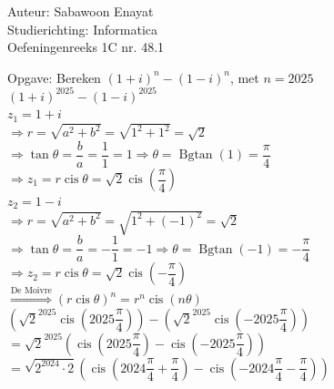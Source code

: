 \documentclass[a4paper]{article}
\begin{document}
  
\noindent \large Auteur: Sabawoon Enayat \\
\noindent \large Studierichting: Informatica\\
\noindent \large Oefeningenreeks 1C nr. 48.1\\

\newcommand{\Bgtan}{\operatorname{Bgtan}}
\newcommand{\cis}{\operatorname{cis}}

\medskip

\normalsize

Opgave: Bereken $(1 + i)^n - (1 - i)^n$, met $n = 2025$\\

$(1 + i)^{2025} - (1 - i)^{2025}$\\

$z_1 = 1 + i$\\

$\Rightarrow r = \sqrt{a^2 + b^2} = \sqrt{1^2 + 1^2} = \sqrt{2}$\\

$\Rightarrow \tan \theta = \dfrac{b}{a} = \dfrac{1}{1} = 1 \Rightarrow \theta = \Bgtan (1) = \dfrac{\pi}{4}$\\

$\Rightarrow z_1 = r \cis \theta = \sqrt{2} \cis \left(\dfrac{\pi}{4}\right)$\\

$z_2 = 1 - i$\\

$\Rightarrow r = \sqrt{a^2 + b^2} = \sqrt{1^2 + (-1)^2} = \sqrt{2}$\\

$\Rightarrow \tan \theta = \dfrac{b}{a} = -\dfrac{1}{1} = -1 \Rightarrow \theta = \Bgtan (-1) = -\dfrac{\pi}{4}$\\

$\Rightarrow z_2 = r \cis \theta = \sqrt{2} \cis \left(-\dfrac{\pi}{4}\right)$\\

$\overset{\text{De Moivre}}{\Rightarrow} (r \cis \theta)^n = r^n \cis (n\theta)$\\

$\left(\sqrt{2}^{2025} \cis \left(2025 \dfrac{\pi}{4}\right)\right) - \left(\sqrt{2}^{2025} \cis \left(-2025 \dfrac{\pi}{4}\right)\right)$\\

$= \sqrt{2}^{2025} \left(\cis\left(2025 \dfrac{\pi}{4}\right) - \cis \left(-2025 \dfrac{\pi}{4}\right)\right)$\\

$= \sqrt{2^{2024} \cdot 2} \left(\cis\left(2024 \dfrac{\pi}{4} + \dfrac{\pi}{4}\right) - \cis \left(-2024 \dfrac{\pi}{4} - \dfrac{\pi}{4}\right)\right)$\\
\end{document}
